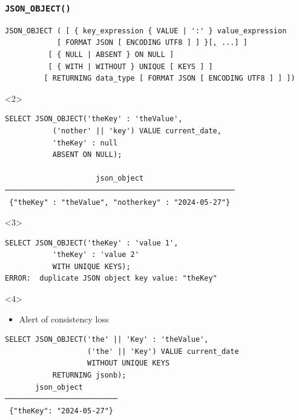 \begin{frame}[fragile]
  \frametitle{\texttt{JSON\_OBJECT()}}

  \begin{lstlisting}
JSON_OBJECT ( [ { key_expression { VALUE | ':' } value_expression
	        [ FORMAT JSON [ ENCODING UTF8 ] ] }[, ...] ]
	      [ { NULL | ABSENT } ON NULL ]
	      [ { WITH | WITHOUT } UNIQUE [ KEYS ] ]
	     [ RETURNING data_type [ FORMAT JSON [ ENCODING UTF8 ] ] ])
  \end{lstlisting}

  \begin{onlyenv}<2>
    \begin{lstlisting}
SELECT JSON_OBJECT('theKey' : 'theValue',
		   ('nother' || 'key') VALUE current_date,
		   'theKey' : null
		   ABSENT ON NULL);

                     json_object                     
─────────────────────────────────────────────────────
 {"theKey" : "theValue", "notherkey" : "2024-05-27"}
    \end{lstlisting}
  \end{onlyenv}

  \begin{onlyenv}<3>
    \begin{lstlisting}
SELECT JSON_OBJECT('theKey' : 'value 1',
		   'theKey' : 'value 2'
		   WITH UNIQUE KEYS);
ERROR:  duplicate JSON object key value: "theKey"
    \end{lstlisting}
  \end{onlyenv}

  \begin{onlyenv}<4>
  \begin{itemize} \item Alert of consistency loss \end{itemize}
    \begin{lstlisting}
SELECT JSON_OBJECT('the' || 'Key' : 'theValue',
                   ('the' || 'Key') VALUE current_date
                   WITHOUT UNIQUE KEYS
		   RETURNING jsonb);
       json_object        
──────────────────────────
 {"theKey": "2024-05-27"}
    \end{lstlisting}
  \end{onlyenv}

\end{frame}


